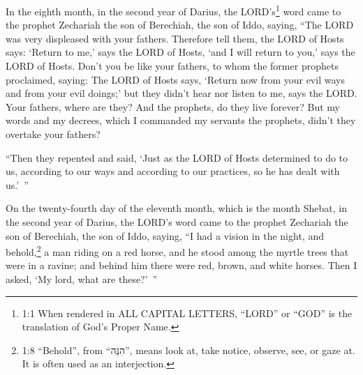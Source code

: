 



\vspace{-1.36in}

\mychapter{} \myverse*{}In the eighth month, in the second year of Darius, the LORD’s\footnote{1:1 When rendered in ALL CAPITAL LETTERS, “LORD” or “GOD” is the translation of God’s Proper Name.}
word came to the prophet Zechariah the son of Berechiah, the son of Iddo, saying,
\myverse{}“The LORD was very displeased with your fathers.
\myverse{}Therefore tell them, the LORD of Hosts says: ‘Return to me,’ says the LORD of
Hosts, ‘and I will return to you,’ says the LORD of Hosts.
\myverse{}Don’t you be like your fathers, to whom the former prophets proclaimed, saying:
The LORD of Hosts says, ‘Return now from your evil ways and from your evil doings;’ but they didn’t hear
nor listen to me, says the LORD.
\myverse{}Your fathers, where are they? And the prophets, do they live forever?
\myverse{}But my words and my decrees, which I commanded my servants the prophets, didn’t
they overtake your fathers?

“Then they repented and said, ‘Just as the LORD of Hosts determined to do to us, according
to our ways and according to our practices, so he has dealt with us.’ ”

\myverse{}On the twenty-fourth day of the eleventh month, which is the month
Shebat, in the second year of Darius, the LORD’s word came to the prophet Zechariah the son of Berechiah,
the son of Iddo, saying,
\myverse{}“I had a vision in the night, and behold,\footnote{1:8 “Behold”, from “הִנֵּה”, means look at, take notice, observe, see, or gaze at. It is
	often used as an interjection.} a man riding on a red horse, and he stood among the myrtle trees
that were in a ravine; and behind him there were red, brown, and white horses.
\myverse{}Then I asked, ‘My lord, what are these?’ ”

